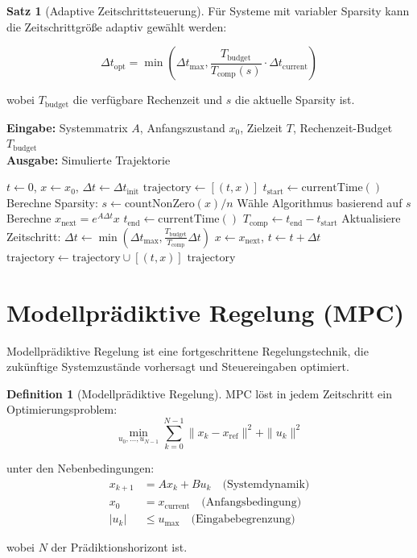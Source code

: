 ﻿\documentclass[a4paper,12pt]{report}
\theoremstyle{definition}
\newtheorem{definition}{Definition}
\newtheorem{satz}{Satz}
\begin{document}
	\begin{satz}[Adaptive Zeitschrittsteuerung]
		Für Systeme mit variabler Sparsity kann die Zeitschrittgröße adaptiv gewählt werden:
		
		\[
		\Delta t_{\text{opt}} = \min\left(\Delta t_{\text{max}}, \frac{T_{\text{budget}}}{T_{\text{comp}}(s)} \cdot \Delta t_{\text{current}}\right)
		\]
		
		wobei $T_{\text{budget}}$ die verfügbare Rechenzeit und $s$ die aktuelle Sparsity ist.
	\end{satz}
	
	\begin{algorithm}[H]
		\caption{Adaptive Echtzeit-Simulation}
		\label{alg:adaptive-realtime}
		\textbf{Eingabe:} Systemmatrix $A$, Anfangszustand $x_0$, Zielzeit $T$, Rechenzeit-Budget $T_{\text{budget}}$ \\
		\textbf{Ausgabe:} Simulierte Trajektorie
		\begin{algorithmic}[1]
			\State $t \gets 0$, $x \gets x_0$, $\Delta t \gets \Delta t_{\text{init}}$
			\State $\text{trajectory} \gets [(t, x)]$
			\State $t_{\text{start}} \gets \text{currentTime}()$
			\State Berechne Sparsity: $s \gets \text{countNonZero}(x) / n$
			\State Wähle Algorithmus basierend auf $s$
			\State Berechne $x_{\text{next}} = e^{A \Delta t} x$
			\State $t_{\text{end}} \gets \text{currentTime}()$
			\State $T_{\text{comp}} \gets t_{\text{end}} - t_{\text{start}}$
			\State Aktualisiere Zeitschritt: $\Delta t \gets \min(\Delta t_{\text{max}}, \frac{T_{\text{budget}}}{T_{\text{comp}}} \Delta t)$
			\State $x \gets x_{\text{next}}$, $t \gets t + \Delta t$
			\State $\text{trajectory} \gets \text{trajectory} \cup [(t, x)]$
			\EndWhile
			\State \Return $\text{trajectory}$
		\end{algorithmic}
	\end{algorithm}
	
	\section{Modellprädiktive Regelung (MPC)}
	
	Modellprädiktive Regelung ist eine fortgeschrittene Regelungstechnik, die zukünftige Systemzustände vorhersagt und Steuereingaben optimiert.
	
	\begin{definition}[Modellprädiktive Regelung]
		MPC löst in jedem Zeitschritt ein Optimierungsproblem:
		\[
		\min_{u_0, \ldots, u_{N-1}} \sum_{k=0}^{N-1} \|x_k - x_{\text{ref}}\|^2 + \|u_k\|^2
		\]
		
		unter den Nebenbedingungen:
		\begin{align}
			x_{k+1} &= A x_k + B u_k \quad \text{(Systemdynamik)} \\
			x_0 &= x_{\text{current}} \quad \text{(Anfangsbedingung)} \\
			|u_k| &\leq u_{\text{max}} \quad \text{(Eingabebegrenzung)}
		\end{align}
		
		wobei $N$ der Prädiktionshorizont ist.
	\end{definition}
	
\end{document}
